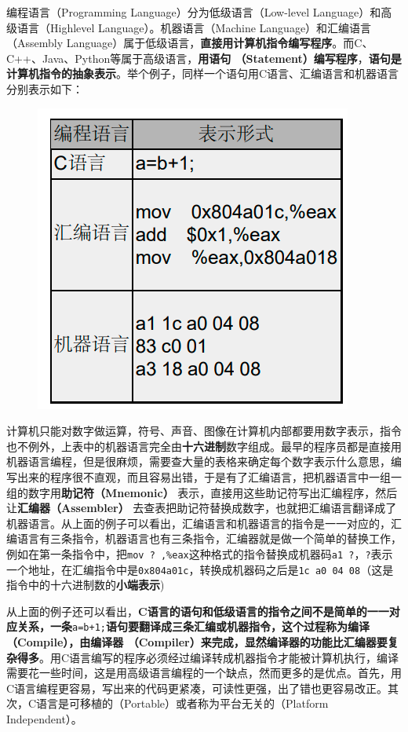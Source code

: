 \documentclass[12pt]{book}
\begin{document}
编程语言（Programming Language）分为低级语言（Low-level
Language）和高级语言（Highlevel Language）。机器语言（Machine
Language）和汇编语言（Assembly
Language）属于低级语言，\textbf{直接用计算机指令编写程序}。而C、C++、Java、Python等属于高级语言，\textbf{用语句
（Statement）编写程序}，\textbf{语句是计算机指令的抽象表示}。举个例子，同样一个语句用C语言、汇编语言和机器语言分别表示如下：\\
\begin{figure}\centering\includegraphics[scale=0.7]{image//C语言入门//程序的基本概念//1.png}\end{figure}

计算机只能对数字做运算，符号、声音、图像在计算机内部都要用数字表示，指令也不例外，上表中的机器语言完全由\textbf{十六进制}数字组成。最早的程序员都是直接用机器语言编程，但是很麻烦，需要查大量的表格来确定每个数字表示什么意思，编写出来的程序很不直观，而且容易出错，于是有了汇编语言，把机器语言中一组一组的数字用\textbf{助记符（Mnemonic）}
表示，直接用这些助记符写出汇编程序，然后让\textbf{汇编器（Assembler）}
去查表把助记符替换成数字，也就把汇编语言翻译成了机器语言。从上面的例子可以看出，汇编语言和机器语言的指令是一一对应的，汇编语言有三条指令，机器语言也有三条指令，汇编器就是做一个简单的替换工作，例如在第一条指令中，把\texttt{mov\ ?\ ,\%eax}这种格式的指令替换成机器码\texttt{a1\ ?}，\texttt{?}表示一个地址，在汇编指令中是\texttt{0x804a01c}，转换成机器码之后是\texttt{1c\ a0\ 04\ 08}（这是指令中的十六进制数的\textbf{小端表示})

从上面的例子还可以看出，\textbf{C语言的语句和低级语言的指令之间不是简单的一一对应关系，一条}\texttt{a=b+1;}\textbf{语句要翻译成三条汇编或机器指令，这个过程称为编译（Compile），由编译器
（Compiler）来完成，显然编译器的功能比汇编器要复杂得多}。用C语言编写的程序必须经过编译转成机器指令才能被计算机执行，编译需要花一些时间，这是用高级语言编程的一个缺点，然而更多的是优点。首先，用C语言编程更容易，写出来的代码更紧凑，可读性更强，出了错也更容易改正。其次，C语言是可移植的（Portable）或者称为平台无关的（Platform
Independent）。
\end{document}
